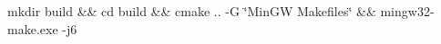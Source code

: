 mkdir build \&\& cd build \&\& cmake .. -\/G \char`\"{}\+Min\+GW Makefiles\char`\"{} \&\& mingw32-\/make.\+exe -\/j6 